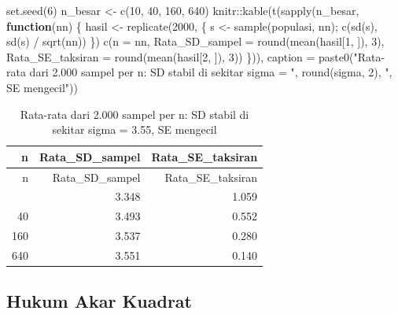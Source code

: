 \documentclass[
  indonesian,
  letterpaper,
]{book}
\newenvironment{Shaded}{\begin{snugshade}}{\end{snugshade}}
\newcommand{\AttributeTok}[1]{\textcolor[rgb]{0.40,0.45,0.13}{#1}}
\newcommand{\ControlFlowTok}[1]{\textcolor[rgb]{0.00,0.23,0.31}{\textbf{#1}}}
\newcommand{\DecValTok}[1]{\textcolor[rgb]{0.68,0.00,0.00}{#1}}
\newcommand{\FunctionTok}[1]{\textcolor[rgb]{0.28,0.35,0.67}{#1}}
\newcommand{\NormalTok}[1]{\textcolor[rgb]{0.00,0.23,0.31}{#1}}
\newcommand{\OtherTok}[1]{\textcolor[rgb]{0.00,0.23,0.31}{#1}}
\newcommand{\SpecialCharTok}[1]{\textcolor[rgb]{0.37,0.37,0.37}{#1}}
\newcommand{\StringTok}[1]{\textcolor[rgb]{0.13,0.47,0.30}{#1}}
\begin{document}
\begin{Shaded}
\begin{Highlighting}[]
\FunctionTok{set.seed}\NormalTok{(}\DecValTok{6}\NormalTok{)}
\NormalTok{n\_besar }\OtherTok{\textless{}{-}} \FunctionTok{c}\NormalTok{(}\DecValTok{10}\NormalTok{, }\DecValTok{40}\NormalTok{, }\DecValTok{160}\NormalTok{, }\DecValTok{640}\NormalTok{)}
\NormalTok{knitr}\SpecialCharTok{::}\FunctionTok{kable}\NormalTok{(}\FunctionTok{t}\NormalTok{(}\FunctionTok{sapply}\NormalTok{(n\_besar, }\ControlFlowTok{function}\NormalTok{(nn) \{}
\NormalTok{  hasil }\OtherTok{\textless{}{-}} \FunctionTok{replicate}\NormalTok{(}\DecValTok{2000}\NormalTok{, \{ s }\OtherTok{\textless{}{-}} \FunctionTok{sample}\NormalTok{(populasi, nn); }\FunctionTok{c}\NormalTok{(}\FunctionTok{sd}\NormalTok{(s), }\FunctionTok{sd}\NormalTok{(s) }\SpecialCharTok{/} \FunctionTok{sqrt}\NormalTok{(nn)) \})}
  \FunctionTok{c}\NormalTok{(}\AttributeTok{n =}\NormalTok{ nn, }\AttributeTok{Rata\_SD\_sampel =} \FunctionTok{round}\NormalTok{(}\FunctionTok{mean}\NormalTok{(hasil[}\DecValTok{1}\NormalTok{, ]), }\DecValTok{3}\NormalTok{),}
    \AttributeTok{Rata\_SE\_taksiran =} \FunctionTok{round}\NormalTok{(}\FunctionTok{mean}\NormalTok{(hasil[}\DecValTok{2}\NormalTok{, ]), }\DecValTok{3}\NormalTok{))}
\NormalTok{\})), }\AttributeTok{caption =} \FunctionTok{paste0}\NormalTok{(}\StringTok{"Rata{-}rata dari 2.000 sampel per n: SD stabil di sekitar sigma = "}\NormalTok{,}
                      \FunctionTok{round}\NormalTok{(sigma, }\DecValTok{2}\NormalTok{), }\StringTok{", SE mengecil"}\NormalTok{))}
\end{Highlighting}
\end{Shaded}

\begin{longtable}[]{@{}rrr@{}}
\caption{Rata-rata dari 2.000 sampel per n: SD stabil di sekitar sigma =
3.55, SE mengecil}\tabularnewline
\toprule\noalign{}
n & Rata\_SD\_sampel & Rata\_SE\_taksiran \\
\midrule\noalign{}
\endfirsthead
\toprule\noalign{}
n & Rata\_SD\_sampel & Rata\_SE\_taksiran \\
\midrule\noalign{}
\endhead
\bottomrule\noalign{}
\endlastfoot
10 & 3.348 & 1.059 \\
40 & 3.493 & 0.552 \\
160 & 3.537 & 0.280 \\
640 & 3.551 & 0.140 \\
\end{longtable}

\subsection{Hukum Akar Kuadrat}\label{hukum-akar-kuadrat}
\end{document}
